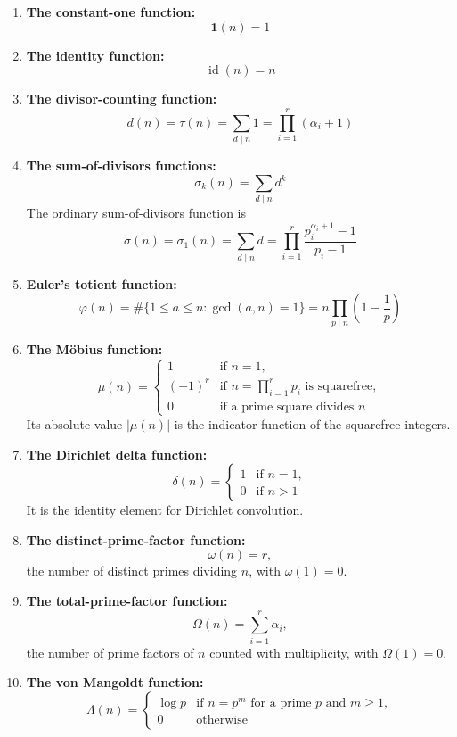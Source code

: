 \documentclass[a4paper,11pt,abstracton]{scrartcl}
\theoremstyle{dotlessP}
\theoremstyle{dotlessS}
\theoremstyle{remark}
\theoremstyle{definition}
\begin{document}
\begin{enumerate}
\item \textbf{The constant-one function:}
\[
    \mathbf{1}(n)=1
\]

\item \textbf{The identity function:}
\[
    \operatorname{id}(n)=n
\]

\item \textbf{The divisor-counting function:}
\[
    d(n)=\tau(n)=\sum_{d\mid n}1
      =\prod_{i=1}^{r}(\alpha_i+1)
\]

\item \textbf{The sum-of-divisors functions:}
\[
    \sigma_k(n)=\sum_{d\mid n}d^k
\]
The ordinary sum-of-divisors function is
\[
    \sigma(n)=\sigma_1(n)=\sum_{d\mid n}d
      =\prod_{i=1}^{r}
        \frac{p_i^{\alpha_i+1}-1}{p_i-1}
\]

\item \textbf{Euler's totient function:}
\[
    \varphi(n)=\#\{1\leq a\leq n:\gcd(a,n)=1\}
      =n\prod_{p\mid n}\left(1-\frac1p\right)
\]

\item \textbf{The Möbius function:}
\[
    \mu(n)=
      \begin{cases}
          1 & \text{if $n=1$},\\
          (-1)^r & \text{if $n=\prod_{i=1}^{r}p_i$ is squarefree},\\
          0 & \text{if a prime square divides $n$}
      \end{cases}
\]
Its absolute value $|\mu(n)|$ is the indicator function of the
squarefree integers.

\item \textbf{The Dirichlet delta function:}
\[
    \delta(n)=
      \begin{cases}
          1 & \text{if $n=1$},\\
          0 & \text{if $n>1$}
      \end{cases}
\]
It is the identity element for Dirichlet convolution.

\item \textbf{The distinct-prime-factor function:}
\[
    \omega(n)=r,
\]
the number of distinct primes dividing $n$, with $\omega(1)=0$.

\item \textbf{The total-prime-factor function:}
\[
    \Omega(n)=\sum_{i=1}^{r}\alpha_i,
\]
the number of prime factors of $n$ counted with multiplicity, with
$\Omega(1)=0$.

\item \textbf{The von Mangoldt function:}
\[
    \Lambda(n)=
      \begin{cases}
          \log p & \text{if $n=p^m$ for a prime $p$ and $m\geq1$},\\
          0 & \text{otherwise}
      \end{cases}
\]


\end{enumerate}
\end{document}
